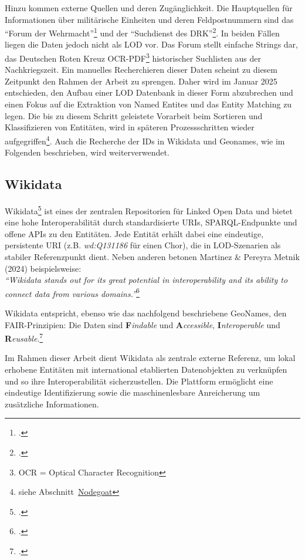 \documentclass[12pt, a4paper, ngerman, bidi=default]{article}
\let\cite\footcite
\begin{document}
Hinzu kommen externe Quellen und deren Zugänglichkeit. Die Hauptquellen für Informationen 
über militärische Einheiten und deren Feldpostnummern sind das \enquote{Forum der Wehrmacht}\cite[ vgl.][]{altenburger_lexikon_nodate} 
und der \enquote{Suchdienst des DRK}\cite[ vgl.][]{reuter_drk_2025}. In beiden Fällen liegen die Daten jedoch nicht als LOD vor. Das Forum stellt einfache Strings dar, das Deutschen Roten Kreuz OCR-PDF\footnote{OCR = Optical Character Recognition} historischer Suchlisten aus der Nachkriegszeit. Ein manuelles Recherchieren dieser Daten scheint zu diesem Zeitpunkt
den Rahmen der Arbeit zu sprengen. Daher wird im Januar 2025 entschieden, den Aufbau einer LOD Datenbank in dieser Form abzubrechen und einen Fokus auf die Extraktion von Named Entites und das Entity Matching zu legen. Die bis zu diesem Schritt geleistete Vorarbeit beim Sortieren und Klassifizieren von Entitäten, wird in späteren Prozessschritten wieder aufgegriffen\footnote{siehe Abschnitt~\hyperref[subsec:Nodegoat_chapter]{Nodegoat}}. Auch die Recherche der IDs in Wikidata und Geonames, wie im Folgenden beschrieben, wird weiterverwendet. 

\subsection{Wikidata}\label{subsec:wikidata}

Wikidata\cite[vgl.][]{noauthor_wikidata_nodate} ist eines der zentralen Repositorien für Linked Open Data und bietet eine hohe Interoperabilität durch standardisierte
URIs, SPARQL-Endpunkte und offene APIs zu den Entitäten.
Jede Entität erhält dabei eine eindeutige, persistente URI 
(z.B. \colorbox{VeryLightGray}{\textit{wd:Q131186}} für einen Chor), die in LOD-Szenarien 
als stabiler Referenzpunkt dient.
Neben anderen betonen Martinez \& Pereyra Metnik (2024) beispielsweise: \\
\textit{\enquote{Wikidata stands out for its great potential in interoperability and its ability to connect data from various domains.}}\cite{martinez_comparative_nodate}

Wikidata entspricht, ebenso wie das nachfolgend beschriebene GeoNames, den FAIR-Prinzipien: Die Daten sind 
\textbf{F}\textit{indable} und \textbf{A}\textit{ccessible}, \textbf{I}\textit{nteroperable} und \textbf{R}\textit{eusable}.\cite[vgl.][S. 2]{wilkinson_fair_2016}

Im Rahmen dieser Arbeit dient Wikidata als zentrale externe Referenz, um lokal erhobene Entitäten mit international etablierten Datenobjekten 
zu verknüpfen und so ihre Interoperabilität sicherzustellen. Die Plattform ermöglicht eine eindeutige Identifizierung sowie die maschinenlesbare 
Anreicherung um zusätzliche Informationen.
\end{document}
